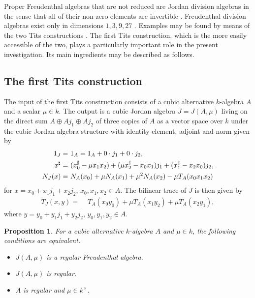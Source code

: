 \documentclass{amsart}
\newtheorem{prop}[equation]{Proposition}
\theoremstyle{definition} %
\theoremstyle{remark} %
\renewcommand{\:}{\colon\,}
\numberwithin{equation}{section}
\begin{document}
Proper Freudenthal algebras that are not reduced are Jordan division algebras in the sense that all of their non-zero elements are invertible \cite[Thm.~39.6]{MR4806163}. Freudenthal division algebras exist only in dimensions $1,3,9,27$ \cite[Thm.~46.8]{MR4806163}. Examples may be found by means of the two Tits constructions \cite[Chap.~VII]{MR4806163}. The first Tits construction, which is the more easily accessible of the two, plays a particularly important role in the present investigation. Its main ingredients may be described as follows.

\subsection{The first Tits construction} \label{ss.FITICO} The input of the first Tits construction consists of a cubic alternative $k$-algebra $A$ and a scalar $\mu \in k$. The output is a cubic Jordan algebra $J = J(A,\mu)$ living on the direct sum $A \oplus Aj_1 \oplus Aj_2$ of three copies of $A$ as a vector space over $k$ under the cubic Jordan algebra structure with identity element, adjoint and norm given by
\begin{align}
1_J =\,\,&1_A = 1_A + 0\cdot j_1 + 0\cdot j_2, \notag \\
x^\sharp =\,\,& (x_0^\sharp - \mu x_1x_2) + (\mu x_2^\sharp - x_0x_1)j_1 + (x_1^\sharp - x_2x_0)j_2, \notag \\
\label{FITNOR} N_J(x) =\,\,&N_A(x_0) + \mu N_A(x_1) + \mu^2N_A(x_2) - \mu T_A(x_0x_1x_2)
\end{align}
for $x = x_0 + x_1j_1 + x_2j_2$, $x_0,x_1,x_2 \in A$. The bilinear trace of $J$ is then given by
\begin{align}
\label{FITBLT} T_J(x,y) =\,\,&T_A(x_0y_0) + \mu T_A(x_1y_2) + \mu T_A(x_2y_1),   
\end{align}
where $y = y_0 + y_1j_1 + y_2j_2$, $y_0,y_1,y_2 \in A$.

\begin{prop} \label{p.FITFRE}
For a cubic alternative $k$-algebra $A$ and $\mu \in k$, the following conditions are equivalent.
\begin{itemize}
\item [(i)] $J(A,\mu)$ is a regular Freudenthal algebra.

\item [(ii)] $J(A,\mu)$ is regular.

\item [(iii)] $A$ is regular and $\mu \in k^\times$.
\end{itemize}
\end{prop}
\end{document}
